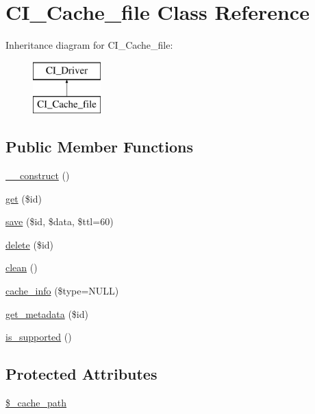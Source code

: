 \hypertarget{class_c_i___cache__file}{\section{C\-I\-\_\-\-Cache\-\_\-file Class Reference}
\label{class_c_i___cache__file}
}
Inheritance diagram for C\-I\-\_\-\-Cache\-\_\-file\-:\begin{figure}[H]
\begin{center}
\leavevmode
\includegraphics[height=2.000000cm]{class_c_i___cache__file}
\end{center}
\end{figure}
\subsection*{Public Member Functions}
\begin{DoxyCompactItemize}
\item 
\hyperlink{class_c_i___cache__file_a095c5d389db211932136b53f25f39685}{\-\_\-\-\_\-construct} ()
\item 
\hyperlink{class_c_i___cache__file_a50e3bfb586b2f42932a6a93f3fbb0828}{get} (\$id)
\item 
\hyperlink{class_c_i___cache__file_a747c50183a4ed7009899628fa75c562b}{save} (\$id, \$data, \$ttl=60)
\item 
\hyperlink{class_c_i___cache__file_a2f8258add505482d7f00ea26493a5723}{delete} (\$id)
\item 
\hyperlink{class_c_i___cache__file_adb40b812890a8bc058bf6b7a0e1a54d9}{clean} ()
\item 
\hyperlink{class_c_i___cache__file_aa8b9c4d9f0387156736ccd8850f0727e}{cache\-\_\-info} (\$type=N\-U\-L\-L)
\item 
\hyperlink{class_c_i___cache__file_a59635cf18e997c5141bffa05ff7622e0}{get\-\_\-metadata} (\$id)
\item 
\hyperlink{class_c_i___cache__file_a98c68fd153468bc148c4ed8c716859fc}{is\-\_\-supported} ()
\end{DoxyCompactItemize}
\subsection*{Protected Attributes}
\begin{DoxyCompactItemize}
\item 
\hyperlink{class_c_i___cache__file_ae9407d6ae1ddd132cca3c7f855f89dfe}{\$\-\_\-cache\-\_\-path}
\end{DoxyCompactItemize}


